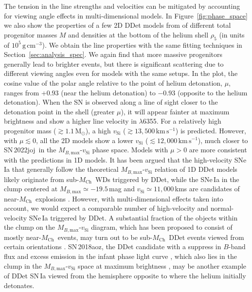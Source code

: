 \documentclass[twocolumn]{aastex631}
\newcommand{\sn}{SN\,2022joj}
\newcommand{\Mch}{$M_\mathrm{Ch}$}
\newcommand{\kms}{$\mathrm{km}\,\mathrm{s}^{-1}$}
\begin{document}
\begin{CJK*}{UTF8}{gbsn}
The tension in the line strengths and velocities can be mitigated by accounting for viewing angle effects in multi-dimensional models. In Figure~\ref{fig:phase_space} we also show the properties of a few 2D DDet models from \citet{Shen_2D_2021} of different total progenitor masses $M$ and densities at the bottom of the helium shell $\rho_5$ (in units of $\mathrm{10^5\,g\,cm^{-3}}$). We obtain the  line properties with the same fitting techniques in Section~\ref{sec:analysis_spec}. We again find that more massive progenitors generally lead to brighter events, but there is significant scattering due to different viewing angles even for models with the same setups. In the plot, the cosine value of the polar angle relative to the point of helium detonation, $\mu$, ranges from $+0.93$ (near the helium detonation) to $-0.93$ (opposite to the helium detonation). When the SN is observed along a line of sight closer to the detonation point in the shell (greater $\mu$), it will appear fainter at maximum brightness and show a higher line velocity in  $\lambda$6355. For a relatively high progenitor mass ($\gtrsim$$1.1\,\mathrm{M_\odot}$), a high $v_\mathrm{Si}$ ($\gtrsim$$13,500$\,\kms) is predicted. However, with $\mu\lesssim0$, all the 2D models show a lower $v_\mathrm{Si}$ ($\lesssim$$12,000$\,\kms), much closer to \sn\ in the $M_{B,\mathrm{max}}$-$v_\mathrm{Si}$ phase space. Models with $\mu>0$ are more consistent with the predictions in 1D models. It has been argued that the high-velocity SNe\,Ia that generally follow the theoretical $M_{B,\mathrm{max}}$-$v_\mathrm{Si}$ relation of 1D DDet models likely originate from sub-\Mch\ WDs triggered by DDet, while the SNe\,Ia in the clump centered at $M_{B,\mathrm{max}}\simeq-19.5$\,mag and $v_\mathrm{Si}\simeq11,000$\,kms are candidates of near-\Mch\ explosions \citep{polin_observational_2019,Nugent_2023}. However, with multi-dimensional effects taken into account, we would expect a comparable number of high-velocity and normal-velocity SNe\,Ia triggered by DDet. A substantial fraction of the objects within the clump on the $M_{B,\mathrm{max}}$-$v_\mathrm{Si}$ diagram, which has been proposed to consist of mostly near-\Mch\ events, may turn out to be sub-\Mch\ DDet events viewed from certain orientations \citep{Shen_2D_2021}. SN\,2018aoz, the DDet candidate with a suppress in $B$-band flux and excess emission in the infant phase light curve \citep{Ni_2022}, which also lies in the clump in the $M_{B,\mathrm{max}}$-$v_\mathrm{Si}$ space at maximum brightness \citep{Ni_18aoz_2023}, may be another example of DDet SN\,Ia viewed from the hemisphere opposite to where the helium initially detonates.


\end{CJK*}
\end{document}
